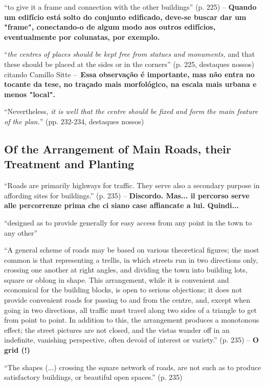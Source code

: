 \documentclass[12pt, a4paper]{book} %
\begin{document}
        ``to give it a frame and connection with the other buildings'' (p. 225) – \textbf{Quando um edifício está solto do conjunto edificado, deve-se buscar dar um "frame", conectando-o de algum modo aos outros edifícios, eventualmente por colunatas, por exemplo.}

        ``\textit{the centres of places should be kept free from statues and monuments,} and that these should be placed at the sides or in the corners'' (p. 225, destaques nossos) citando Camillo Sitte – \textbf{Essa observação é importante, mas não entra no tocante da tese, no traçado mais morfológico, na escala mais urbana e menos "local".}

        ``Nevertheless, \textit{it is well that the centre should be fixed and form the main feature of the plan.}'' (pp. 232-234, destaques nossos)

        \subsection*{Of the Arrangement of Main Roads, their Treatment and Planting}

        ``Roads are primarily highways for traffic. They serve also a secondary purpose in affording sites for buildings.'' (p. 235) – \textbf{Discordo. Mas... il percorso serve alle percorrenze prima che ci siano case affiancate a lui. Quindi...}

        ``designed as to provide generally for easy access from any point in the town to any other''

        ``A general scheme of roads may be based on various theoretical figures; the most common is that representing a trellis, in which streets run in two directions only, crossing one another at right angles, and dividing the town into building lots, square or oblong in shape. This arrangement, while it is convenient and economical for the building blocks, is open to serious objections; it does not provide convenient roads for passing to and from the centre, and, except when going in two directions, all traffic must travel along two sides of a triangle to get from point to point. In addition to this, the arrangement produces a monotonous effect; the street pictures are not closed, and the vistas wander off in an indefinite, vanishing perspective, often devoid of interest or variety.'' (p. 235) – \textbf{O grid (!)}

        ``The shapes (...) crossing the square network of roads, are not such as to produce satisfactory buildings, or beautiful open spaces.'' (p. 235)
\end{document}
